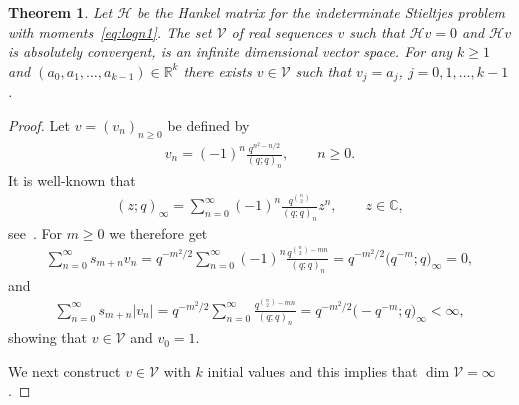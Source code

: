 \documentclass[pdftex]{sigma}
\newcommand{\C}{\mathbb{C}}
\newcommand{\R}{\mathbb{R}}
\numberwithin{equation}{section}
\newtheorem{thm}{Theorem}[section]
\begin{document}
\begin{thm}\label{thm:nonuniq1} Let $\mathcal H$ be the Hankel matrix for the indeterminate Stieltjes problem with moments~\eqref{eq:logn1}. The set $\mathcal V$ of real sequences $v$ such that $\mathcal H v=0$ and $\mathcal H v$ is absolutely convergent, is an infinite dimensional vector space. For any $k\ge 1$ and $(a_0,a_1,\ldots, a_{k-1})\in\R^k$ there exists $v\in\mathcal V$ such that $v_j=a_j$, $j=0,1,\ldots, k-1$.
\end{thm}

\begin{proof} Let $v=(v_n)_{n\ge 0}$ be defined by
\begin{gather}\label{eq:logn4}
v_n=(-1)^n\frac{q^{n^2-n/2}}{(q;q)_n},\qquad n\ge 0.
\end{gather}
It is well-known that
\begin{gather*}
(z;q)_\infty=\sum_{n=0}^\infty (-1)^n\frac{q^{\binom{n}{2}}}{(q;q)_n} z^n,\qquad z\in\C,
\end{gather*}
see~\cite{G:R}. For $m\ge 0$ we therefore get
\begin{gather*}
\sum_{n=0}^\infty s_{m+n}v_n=q^{-m^2/2}\sum_{n=0}^\infty (-1)^n\frac{q^{\binom{n}{2}-mn}}{(q;q)_n}=q^{-m^2/2}\big(q^{-m};q\big)_\infty=0,
\end{gather*}
and
\begin{gather*}
\sum_{n=0}^\infty s_{m+n}|v_n|=q^{-m^2/2}\sum_{n=0}^\infty \frac{q^{\binom{n}{2}-mn}}{(q;q)_n}=q^{-m^2/2}\big({-}q^{-m};q\big)_\infty<\infty,
\end{gather*}
showing that $v\in \mathcal V$ and $v_0=1$.

We next construct $v\in\mathcal V$ with $k$ initial values and this implies that $\dim\mathcal V=\infty$.


\end{proof}
\end{document}
